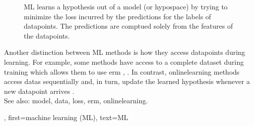{{\begin{figure}[ht]
		\vspace*{-9mm}
		\caption{ML learns a \gls{hypothesis} out of a \gls{model} (or \gls{hypospace}) 
			by trying to minimize the \gls{loss} incurred by the \glspl{prediction} 
			for the \glspl{label} of \glspl{datapoint}. The \glspl{prediction} are 
			comptued solely from the \glspl{feature} of the \glspl{datapoint}.}
		\label{fig_AlexMLBP_dict}
	\end{figure}
	Another distinction between ML methods is how they access \glspl{datapoint} during 
	learning. For example, some methods have access to a complete \gls{dataset} 
	during \gls{training} which allows them to use \gls{erm} \cite{MLBasics}, \cite{HastieWainwrightBook}. 
	In contrast, \gls{onlinelearning} methods access \glspl{data} 
	sequentially and, in turn, update the learned \gls{hypothesis} 
	whenever a new \gls{datapoint} arrives \cite{PredictionLearningGames,HazanOCO,Bottou99}.
	 			\\ 
		See also: \gls{model}, \gls{data}, \gls{loss}, \gls{erm}, \gls{onlinelearning}.},
	first={machine learning (ML)},
	text={ML}
} 


